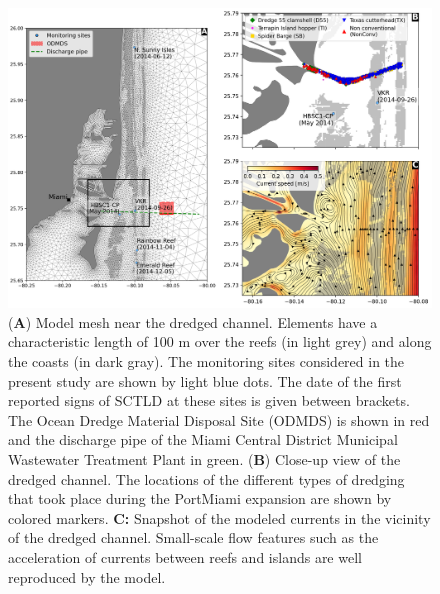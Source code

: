 \documentclass[preprint,12pt,authoryear]{elsarticle}
\begin{document}
\begin{figure}
	\centering
	\includegraphics[width=\textwidth]{figures/fig_mesh_new.png}
	\caption{(\textbf{A}) Model mesh near the dredged channel. Elements have a characteristic length of 100 m over the reefs (in light grey) and along the coasts (in dark gray). The monitoring sites considered in the present study are shown by light blue dots. The date of the first reported signs of SCTLD at these sites is given between brackets. The Ocean Dredge Material Disposal Site (ODMDS) is shown in red and the discharge pipe of the Miami Central District Municipal Wastewater Treatment Plant in green. (\textbf{B}) Close-up view of the dredged channel. The locations of the different types of dredging that took place during the PortMiami expansion are shown by colored markers. \textbf{C:} Snapshot of the modeled currents in the vicinity of the dredged channel. Small-scale flow features such as the acceleration of currents between reefs and islands are well reproduced by the model.}
	\label{fig:onset_mesh}
\end{figure}
\end{document}
